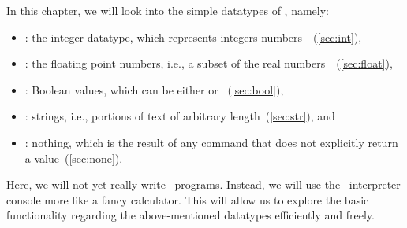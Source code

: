 In this chapter, we will look into the simple datatypes of \python, namely:%
%
\begin{itemize}%
%
\item {}: the integer datatype, which represents integers numbers~\integerNumbers~(\cref{sec:int}),%
\item {}: the floating point numbers, i.e., a subset of the real numbers~\realNumbers~(\cref{sec:float}),%
\item {}: Boolean values, which can be either  or ~(\cref{sec:bool}),%
\item {}: strings, i.e., portions of text of arbitrary length~(\cref{sec:str}), and%
\item {}: nothing, which is the result of any command that does not explicitly return a value~(\cref{sec:none}).%
%
\end{itemize}%
%
Here, we will not yet really write \python\ programs.
Instead, we will use the \python\ interpreter console more like a fancy calculator.
This will allow us to explore the basic functionality regarding the above-mentioned datatypes efficiently and freely.%
%
\endhsection%
%
